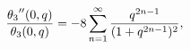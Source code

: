 \[\frac{\mathop{\theta_{3}\/}\nolimits''\!\left(0,q\right)}{\mathop{\theta_{3}\/%
}\nolimits\!\left(0,q\right)}=-8\sum_{n=1}^{\infty}\frac{q^{2n-1}}{(1+q^{2n-1}%
)^{2}},\]